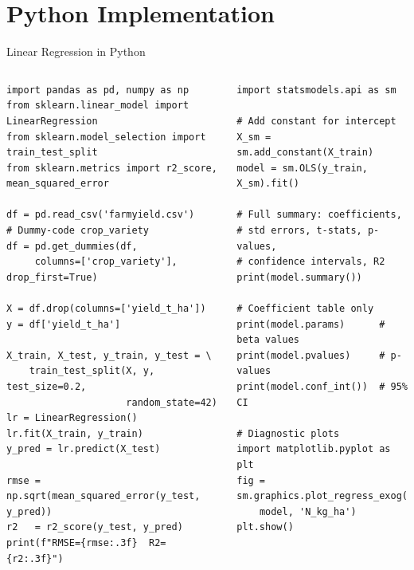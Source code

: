 \documentclass[aspectratio=169,10pt]{beamer}
\begin{document}
\section{Python Implementation}

\begin{frame}[fragile]{Linear Regression in Python}
  \begin{columns}
      \begin{tcolorbox}[codebox,title={\small\bfseries scikit-learn: for prediction}]
        \begin{lstlisting}[style=pycode]
import pandas as pd, numpy as np
from sklearn.linear_model import LinearRegression
from sklearn.model_selection import train_test_split
from sklearn.metrics import r2_score, mean_squared_error

df = pd.read_csv('farmyield.csv')
# Dummy-code crop_variety
df = pd.get_dummies(df,
     columns=['crop_variety'], drop_first=True)

X = df.drop(columns=['yield_t_ha'])
y = df['yield_t_ha']

X_train, X_test, y_train, y_test = \
    train_test_split(X, y, test_size=0.2,
                     random_state=42)
lr = LinearRegression()
lr.fit(X_train, y_train)
y_pred = lr.predict(X_test)

rmse = np.sqrt(mean_squared_error(y_test, y_pred))
r2   = r2_score(y_test, y_pred)
print(f"RMSE={rmse:.3f}  R2={r2:.3f}")
        \end{lstlisting}
      \end{tcolorbox}
      \begin{tcolorbox}[codebox,title={\small\bfseries statsmodels: for inference}]
        \begin{lstlisting}[style=pycode]
import statsmodels.api as sm

# Add constant for intercept
X_sm = sm.add_constant(X_train)
model = sm.OLS(y_train, X_sm).fit()

# Full summary: coefficients,
# std errors, t-stats, p-values,
# confidence intervals, R2
print(model.summary())

# Coefficient table only
print(model.params)      # beta values
print(model.pvalues)     # p-values
print(model.conf_int())  # 95% CI

# Diagnostic plots
import matplotlib.pyplot as plt
fig = sm.graphics.plot_regress_exog(
    model, 'N_kg_ha')
plt.show()
        \end{lstlisting}
      \end{tcolorbox}
  \end{columns}
\end{frame}
\end{document}
